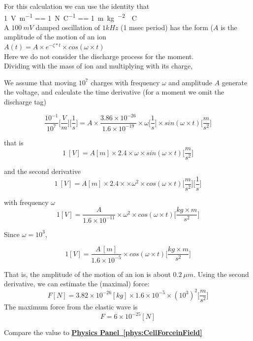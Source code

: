 \ifx\magyar\undefined
{}
{
For this calculation
we can use the identity that
\\
\SI{1}{\volt\per\meter}
== \SI{1}{\newton\per\coulomb} == \SI{1}{\meter\kg\per\sec^2 \per\coulomb}
\\
A $100~mV$ damped oscillation of $1 kHz$ (1 msec period) has the form ($A$ is the amplitude of the motion of an ion
\\
$A(t)=A\times e^{-\zeta*t}\times cos(\omega\times t)$
\\ Here we do not consider the discharge process for the moment.
\\Dividing with the mass of ion and multiplying with its charge, 

We assume that moving $10^7$ charges with frequency $\omega$ and amplitude $A$ generate the voltage, and calculate the
time derivative (for a moment we omit the discharge tag)

\[
\frac{10^{-1}}{10^7} \bigg[\frac{V}{m}\bigg] \bigg[\frac{1}{s}\bigg]
= A\times \frac{3.86\times 10^{-26}}{1.6\times 10^{-19}} \times \omega \bigg[\frac{1}{s}\bigg] \times sin (\omega\times t) \bigg[\frac{m}{s^2}\bigg]
\]

that is
\[
1\ [V] 
= A[m] \times 2.4 \times \omega \times sin (\omega\times t) \bigg[\frac{m}{s^2}\bigg]
\]

and the second derivative
\[
1\ [V]
= A[m] \times 2.4 \times \times \omega^2 \times cos (\omega\times t) \bigg[\frac{m}{s^2}\bigg] \bigg[\frac{1}{s}\bigg]
\]


with frequency $\omega$
\[
1[V] 
= \frac{A}{1.6\times 10^{-11}} \times \omega^2 \times cos (\omega\times t) \bigg[\frac{kg\times m}{s^2}\bigg] \]

Since $\omega=10^{3}$,

\[
1 [V] 
= \frac{A\,[m]}{1.6\times 10^{-5}} \times cos (\omega\times t) \bigg[\frac{kg\times m}{s^2}\bigg] 
\]

That is, the amplitude of the motion of an ion is about $0.2\ \mu m$. Using the second derivative, we can estimate the (maximal) force: 
\[
	F [N] = 3.82 \times 10^{-26} [kg]\times 1.6 \times 10^{-5} \times (10^3)^2 \bigg[\frac{m}{s^2}\bigg]
\]
The maximum force from the elastic wave is
\[
F = 6\times 10^{-25} [N] 
\]

Compare the value to \textbf{\hyperlink{phys:CellForceinField}{Physics Panel~\ref{phys:CellForceinField}}}
}

\else




